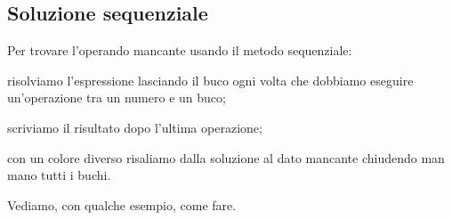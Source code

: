 \subsection{Soluzione sequenziale}

\begin{procedura}
 Per trovare l'operando mancante usando il metodo sequenziale:
\begin{enumerate*}
 \item risolviamo l'espressione lasciando il buco ogni volta che 
  dobbiamo eseguire un'operazione tra un numero e un buco;
 \item scriviamo il risultato dopo l'ultima operazione;
 \item con un colore diverso risaliamo dalla soluzione al dato mancante
  chiudendo man mano tutti i buchi.
\end{enumerate*}
\end{procedura}

Vediamo, con qualche esempio, come fare.

